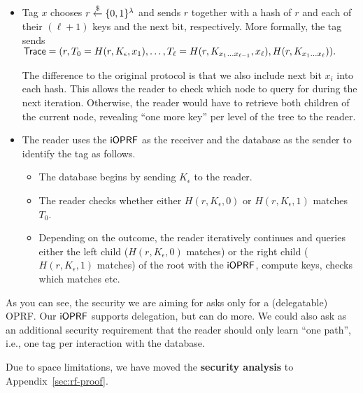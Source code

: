   \begin{itemize}[leftmargin=*]
  \item Tag $x$ chooses
    $r\stackrel{\$}{\leftarrow}\{0,1\}^\lambda$ and sends $r$ together with a hash of $r$
    and each of their $(\ell+1)$ keys and the next bit,
    respectively. More formally, the tag sends 
$    \mathsf{Trace}=(r,T_0=H(r,
    K_\epsilon,x_1),\ldots,T_\ell=H(r,K_{x_1\ldots{}x_{\ell-1}},x_{\ell}),
    H(r,K_{x_1\ldots{}x_\ell})).
    $

The difference to the original protocol is that we also include
next bit $x_i$ into each hash. This allows the reader to check which
node to query for during the next iteration. Otherwise, the reader
would have to retrieve both children of the current node, revealing 
``one more key'' per level of the tree to the reader.

\item The reader uses the $\mathsf{i}\mathsf{OPRF}$ as the receiver and the database as
  the sender to identify the tag as follows.

 \begin{itemize}
 \item The database begins by sending $K_\epsilon$ to the reader.
   
  \item The reader checks whether either $H(r,K_\epsilon,0)$ or $H(r,K_\epsilon,1)$  matches
    $T_0$.

  \item Depending on the outcome, the reader iteratively continues and
    queries either the left child ($H(r,K_\epsilon,0)$ matches) or the
    right child ($H(r,K_\epsilon,1)$ matches) of the root with the
    $\mathsf{i}\mathsf{OPRF}$, compute keys, checks which matches etc.
\end{itemize}
  \end{itemize}

As you can see, the security we are aiming for asks only for a
(delegatable) OPRF. Our $\mathsf{i}\mathsf{OPRF}$ supports delegation, but can do more. We
could also ask as an additional security requirement that the reader
should only learn ``one path'', i.e., one tag per interaction with the
database. 

 Due to space limitations,
we have moved the {\bf security analysis} to Appendix~\ref{sec:rf-proof}.
